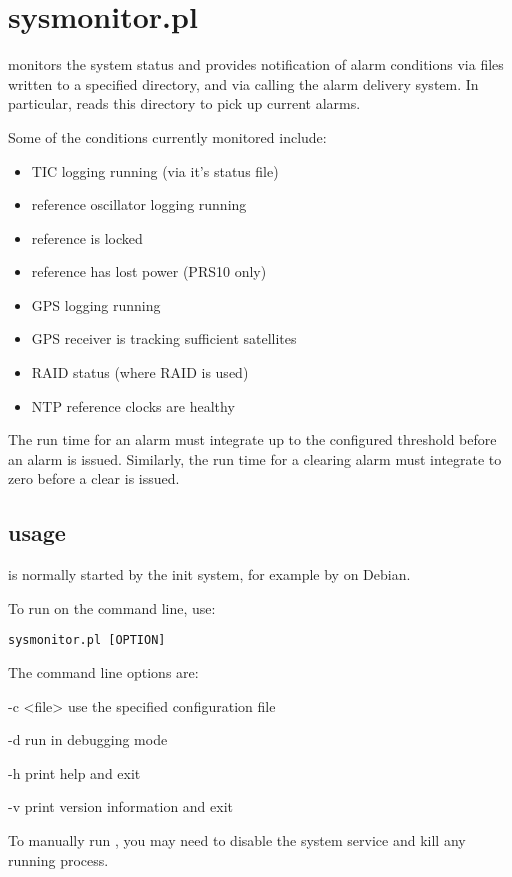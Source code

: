 \section{sysmonitor.pl \label{ssysmonitor}}

 monitors the system status and provides notification of alarm conditions via 
files written to a specified directory, and via calling the alarm delivery system. In particular, 
 reads this directory to pick up current alarms.

Some of the conditions currently monitored include:
\begin{itemize}
\item TIC logging running (via it's status file)
\item reference oscillator logging running
\item reference is locked
\item reference has lost power (PRS10 only)
\item GPS logging running
\item GPS receiver is tracking sufficient satellites
\item RAID status (where RAID is used)
\item NTP reference clocks are healthy
\end{itemize}

The run time for an alarm must integrate up to the configured threshold before an alarm is issued. 
Similarly, the run time for a clearing alarm must integrate to zero before a clear is issued.

\subsection{usage}
 is normally started by the init system, for example by  on Debian.

To run  on the command line, use:
\begin{lstlisting}
sysmonitor.pl [OPTION]
\end{lstlisting}
The command line options are:
\begin{description*}
	\item[-c \textless file\textgreater]	use the specified configuration file 
	\item[-d]	run in debugging mode
	\item[-h]	print help and exit
	\item[-v]	print version information and exit
\end{description*}
To manually run , you may need to disable the system service
and kill any running  process.

